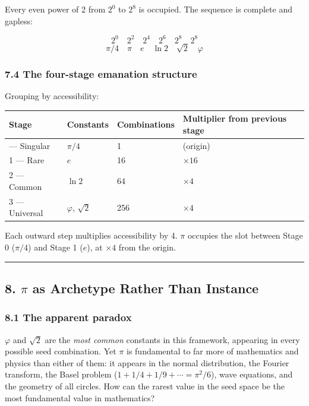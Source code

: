 \documentclass[
  11pt,
  letterpaper,
]{article}
\begin{document}
Every even power of 2 from \(2^0\) to \(2^8\) is occupied. The sequence
is complete and gapless:

\[
2^0 \quad 2^2 \quad 2^4 \quad 2^6 \quad 2^8 \quad 2^8
\] \[
\pi/4 \quad \pi \quad e \quad \ln 2 \quad \sqrt{2} \quad \varphi
\]

\subsubsection{7.4 The four-stage emanation
structure}\label{the-four-stage-emanation-structure}

Grouping by accessibility:

\begin{longtable}[]{@{}llll@{}}
\toprule\noalign{}
Stage & Constants & Combinations & Multiplier from previous stage \\
\midrule\noalign{}
\endhead
\bottomrule\noalign{}
\endlastfoot
0 --- Singular & \(\pi/4\) & 1 & (origin) \\
1 --- Rare & \(e\) & 16 & \(\times 16\) \\
2 --- Common & \(\ln 2\) & 64 & \(\times 4\) \\
3 --- Universal & \(\varphi\), \(\sqrt{2}\) & 256 & \(\times 4\) \\
\end{longtable}

Each outward step multiplies accessibility by 4. \(\pi\) occupies the
slot between Stage 0 (\(\pi/4\)) and Stage 1 (\(e\)), at \(\times 4\)
from the origin.

\begin{center}\rule{0.5\linewidth}{0.5pt}\end{center}

\subsection{\texorpdfstring{8. \(\pi\) as Archetype Rather Than
Instance}{8. \textbackslash pi as Archetype Rather Than Instance}}\label{pi-as-archetype-rather-than-instance}

\subsubsection{8.1 The apparent paradox}\label{the-apparent-paradox}

\(\varphi\) and \(\sqrt{2}\) are the \emph{most common} constants in
this framework, appearing in every possible seed combination. Yet
\(\pi\) is fundamental to far more of mathematics and physics than
either of them: it appears in the normal distribution, the Fourier
transform, the Basel problem (\(1 + 1/4 + 1/9 + \cdots = \pi^2/6\)),
wave equations, and the geometry of all circles. How can the rarest
value in the seed space be the most fundamental value in mathematics?
\end{document}
